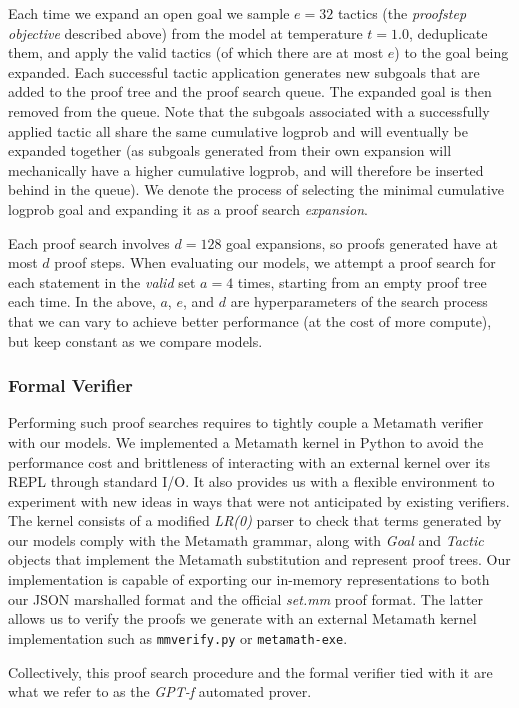 Each time we expand an open goal we sample $e=32$ tactics (the \textit{proofstep objective} described above) from the model at temperature $t=1.0$, deduplicate them, and apply the valid tactics (of which there are at most $e$) to the goal being expanded. Each successful tactic application generates new subgoals that are added to the proof tree and the proof search queue. The expanded goal is then removed from the queue. Note that the subgoals associated with a successfully applied tactic all share the same cumulative logprob and will eventually be expanded together (as subgoals generated from their own expansion will mechanically have a higher cumulative logprob, and will therefore be inserted behind in the queue). We denote the process of selecting the minimal cumulative logprob goal and expanding it as a proof search \textit{expansion}. 

Each proof search involves $d=128$ goal expansions, so proofs generated have at most $d$ proof steps. When evaluating our models, we attempt a proof search for each statement in the \textit{valid} set $a=4$ times, starting from an empty proof tree each time. In the above, $a$, $e$, and $d$ are hyperparameters of the search process that we can vary to achieve better performance (at the cost of more compute), but keep constant as we compare models.

\subsubsection{Formal Verifier} Performing such proof searches requires to tightly couple a Metamath verifier with our models. We implemented a Metamath kernel in Python to avoid the performance cost and brittleness of interacting with an external kernel over its REPL through standard I/O. It also provides us with a flexible environment to experiment with new ideas in ways that were not anticipated by existing verifiers. The kernel consists of a modified \textit{LR(0)} parser to check that terms generated by our models comply with the Metamath grammar, along with \textit{Goal} and \textit{Tactic} objects that implement the Metamath substitution and represent proof trees. Our implementation is capable of exporting our in-memory representations to both our JSON marshalled format and the official \textit{set.mm} proof format. The latter allows us to verify the proofs we generate with an external Metamath kernel implementation such as \verb|mmverify.py| or \verb|metamath-exe|.

Collectively, this proof search procedure and the formal verifier tied with it are what we refer to as the \textit{GPT-f} automated prover.

